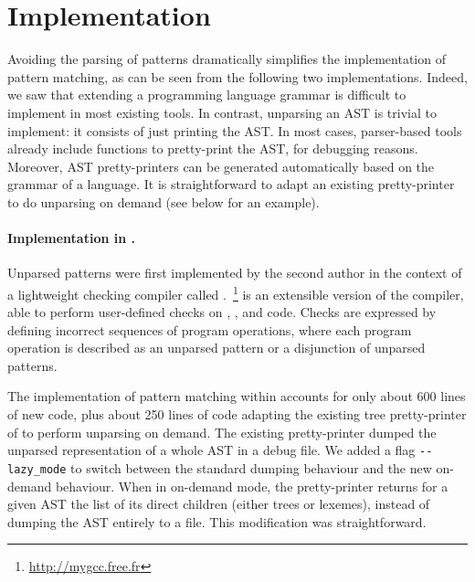 
\section{Implementation}
\label{implementation}

Avoiding the parsing of patterns dramatically simplifies the
implementation of pattern matching, as can be seen from the following
two implementations. Indeed, we saw that extending a programming
language grammar is difficult to implement in most existing tools. In
contrast, unparsing an AST is trivial to implement: it consists of
just printing the AST. In most cases, parser\hyp{}based tools already
include functions to pretty\hyp{}print the AST, for debugging
reasons. Moreover, AST pretty\hyp{}printers can be generated
automatically based on the grammar of a language. It is
straightforward to adapt an existing pretty\hyp{}printer to do
unparsing on demand (see below for an example).

\paragraph{Implementation in \MyGCC.}

Unparsed patterns were first implemented by the second author in the
context of a lightweight checking compiler called
\MyGCC.~\footnote{\url{http://mygcc.free.fr}} \MyGCC is an extensible
version of the \GCC compiler, able to perform user\hyp{}defined checks
on \Clang, \cpp, and \Ada code. Checks are expressed by defining
incorrect sequences of program operations, where each program
operation is described as an unparsed pattern or a disjunction of
unparsed patterns.

The implementation of pattern matching within \MyGCC accounts for only
about 600 lines of new \Clang code, plus about 250 lines of code
adapting the existing tree pretty\hyp{}printer of \GCC to perform
unparsing on demand. The existing pretty\hyp{}printer dumped the
unparsed representation of a whole AST in a debug file. We added a
flag \verb|--lazy_mode| to switch between the standard dumping
behaviour and the new on\hyp{}demand behaviour. When in on\hyp{}demand
mode, the pretty\hyp{}printer returns for a given AST the list of its
direct children (either trees or lexemes), instead of dumping the AST
entirely to a file. This modification was straightforward.

